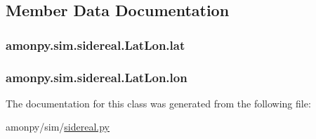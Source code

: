 \subsection{Member Data Documentation}
\hypertarget{classamonpy_1_1sim_1_1sidereal_1_1_lat_lon_a0e2c9402d3ac86eb39a9d1665af225b1}{
\subsubsection[{lat}]{\setlength{\rightskip}{0pt plus 5cm}amonpy.\-sim.\-sidereal.\-Lat\-Lon.\-lat}}\label{classamonpy_1_1sim_1_1sidereal_1_1_lat_lon_a0e2c9402d3ac86eb39a9d1665af225b1}
\hypertarget{classamonpy_1_1sim_1_1sidereal_1_1_lat_lon_a9ee8ebd4f37cfe0431ed461eb9f3fdc9}{
\subsubsection[{lon}]{\setlength{\rightskip}{0pt plus 5cm}amonpy.\-sim.\-sidereal.\-Lat\-Lon.\-lon}}\label{classamonpy_1_1sim_1_1sidereal_1_1_lat_lon_a9ee8ebd4f37cfe0431ed461eb9f3fdc9}


The documentation for this class was generated from the following file\-:\begin{DoxyCompactItemize}
\item 
amonpy/sim/\hyperlink{sidereal_8py}{sidereal.\-py}\end{DoxyCompactItemize}
